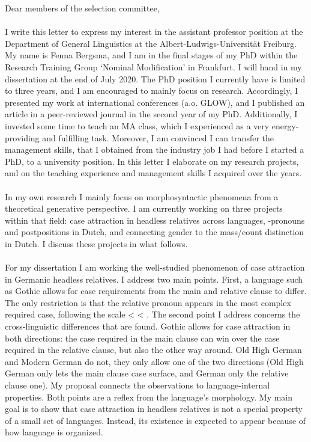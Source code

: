 \documentclass[12pt]{article}
\begin{document}
\raggedright

Dear members of the selection committee,\\

\phantom{x}\\

I write this letter to express my interest in the assistant professor position at the Department of General Linguistics at the Albert-Ludwigs-Universität Freiburg. My name is Fenna Bergsma, and I am in the final stages of my PhD within the Research Training Group `Nominal Modification' in Frankfurt. I will hand in my dissertation at the end of July 2020. The PhD position I currently have is limited to three years, and I am encouraged to mainly focus on research. Accordingly, I presented my work at international conferences (a.o. GLOW), and I published an article in a peer-reviewed journal in the second year of my PhD. Additionally, I invested some time to teach an MA class, which I experienced as a very energy-providing and fulfilling task. Moreover, I am convinced I can transfer the management skills, that I obtained from the industry job I had before I started a PhD, to a university position. In this letter I elaborate on my research projects, and on the teaching experience and management skills I acquired over the years.\\

\phantom{x}\\

In my own research I mainly focus on morphosyntactic phenomena from a theoretical generative perspective. I am currently working on three projects within that field: case attraction in headless relatives across languages, -pronouns and postpositions in Dutch, and connecting gender to the mass/count distinction in Dutch. I discuss these projects in what follows.\\

\phantom{x}\\

For my dissertation I am working the well-studied phenomenon of case attraction in Germanic headless relatives. I address two main points. First, a language such as Gothic allows for case requirements from the main and relative clause to differ. The only restriction is that the relative pronoun appears in the most complex required case, following the scale  <  < . The second point I address concerns the cross-linguistic differences that are found. Gothic allows for case attraction in both directions: the case required in the main clause can win over the case required in the relative clause, but also the other way around. Old High German and Modern German do not, they only allow one of the two directions (Old High German only lets the main clause case surface, and German only the relative clause one). My proposal connects the observations to language-internal properties. Both points are a reflex from the language’s morphology. My main goal is to show that case attraction in headless relatives is not a special property of a small set of languages. Instead, its existence is expected to appear because of how language is organized.\\
\end{document}
